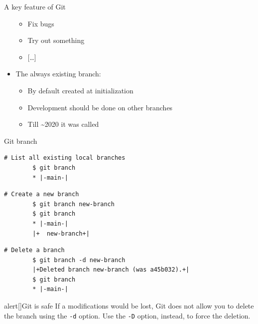 \documentclass[usenames,svgnames,14pt]{beamer}
\begin{document}
\begin{frame}[label=current]{A key feature of Git}
\begin{overlayarea}{\textwidth}{0.7\textheight}
\begin{itemize}
\begin{itemize}
                      \item Fix bugs
                      \item Try out something
                      \item {}[\ldots]
                  \end{itemize}
            \item<2-> The always existing \;\; branch:
                  \begin{itemize}
                      \item By default created at initialization
                      \item Development should be done on other branches
                      \item Till \textasciitilde2020 it was called \;
                  \end{itemize}
        \end{itemize}
    \end{overlayarea}
\end{frame}
\begin{frame}[fragile]{Git branch}
    \begin{lstlisting}[style=MyBash]
        # List all existing local branches
        $ git branch
        * |-main-|
    \end{lstlisting}
    \begin{lstlisting}[style=MyBash]
        # Create a new branch
        $ git branch new-branch
        $ git branch
        * |-main-|
        |+  new-branch+|
    \end{lstlisting}
    \begin{lstlisting}[style=MyBash]
        # Delete a branch
        $ git branch -d new-branch
        |+Deleted branch new-branch (was a45b032).+|
        $ git branch
        * |-main-|
    \end{lstlisting}
    \begin{varblock}{alert}[\textwidth]{Git is safe}
        \small
        If a modifications would be lost, Git does not allow you to delete the branch using the \texttt{-d} option.
        Use the \texttt{-D} option, instead, to force the deletion.
    \end{varblock}
\end{frame}
\end{document}
